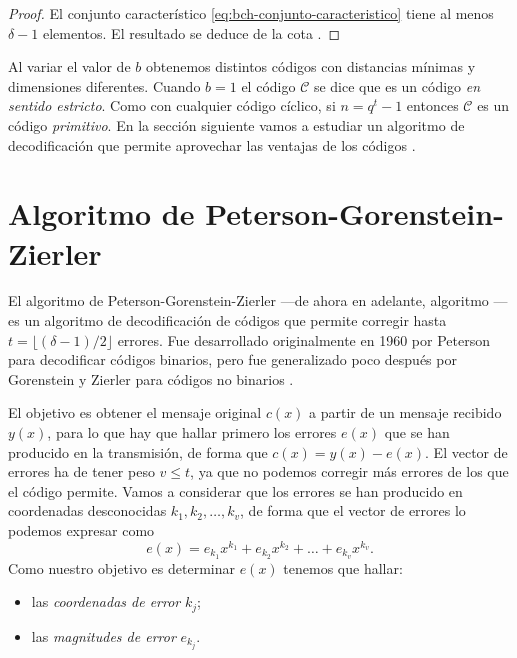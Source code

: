 \begin{proof}
  El conjunto característico \ref{eq:bch-conjunto-caracteristico} tiene al menos \(\delta - 1\) elementos.
  El resultado se deduce de la cota .
\end{proof}

Al variar el valor de \(b\) obtenemos distintos códigos con distancias mínimas y dimensiones diferentes.
Cuando \(b = 1\) el código \(\mathcal C\) se dice que es un código  \textit{en sentido estricto}.
Como con cualquier código cíclico, si \(n = q^t - 1\) entonces \(\mathcal C\) es un código  \textit{primitivo}.
En la sección siguiente vamos a estudiar un algoritmo de decodificación que permite aprovechar las ventajas de los códigos .

\section{Algoritmo de Peterson-Gorenstein-Zierler}

El algoritmo de Peterson-Gorenstein-Zierler —de ahora en adelante, algoritmo — es un algoritmo de decodificación de códigos  que permite corregir hasta \(t = \lfloor (\delta - 1)/2 \rfloor\) errores.
Fue desarrollado originalmente en 1960 por Peterson \parencite{peterson_encoding_1960} para decodificar códigos  binarios, pero fue generalizado poco después por Gorenstein y Zierler para códigos no binarios \parencite{gorenstein_class_1961}.

El objetivo es obtener el mensaje original \(c(x)\) a partir de un mensaje recibido \(y(x)\), para lo que hay que hallar primero los errores \(e(x)\) que se han producido en la transmisión, de forma que \(c(x) = y(x) - e(x)\).
El vector de errores ha de tener peso \(v \leq t\), ya que no podemos corregir más errores de los que el código permite.
Vamos a considerar que los errores se han producido en coordenadas desconocidas \(k_1, k_2, \dots, k_v\), de forma que el vector de errores lo podemos expresar como
\[
  e(x) = e_{k_1}x^{k_1} + e_{k_2}x^{k_2} + \dots + e_{k_v}x^{k_v}.
\]
Como nuestro objetivo es determinar \(e(x)\) tenemos que hallar: \begin{itemize}
  \item las \textit{coordenadas de error} \(k_j\);
  \item las \textit{magnitudes de error} \(e_{k_j}\).
\end{itemize}

